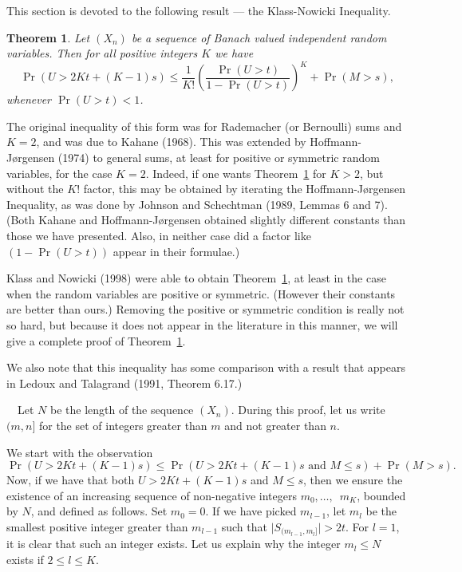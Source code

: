 \documentclass[12pt]{article}
\newtheorem{thm}{Theorem}[section]
\newcommand{\smodo}[1]{{\mathopen|#1\mathclose|}}
\newcommand{\Proof}{\medskip\noindent{\bf Proof:}\ \ }
\begin{document}
This section is devoted to the following result --- the Klass-Nowicki
Inequality.

\begin{thm}
\label{klass-nowicki}
Let $(X_n)$ be a sequence of Banach valued independent random
variables. Then for all positive integers $K$ we have 
$$ \Pr(U > 2K t + (K-1)s)
   \le {\frac{1 }{ K!}} \left(\frac{\Pr(U > t) }{ 1 -
   \Pr(U > t) }\right)^{K}+ \Pr(M > s) ,$$
whenever $\Pr(U>t) < 1$.
\end{thm}

The original inequality of this form was 
for Rademacher (or Bernoulli) sums and $K=2$, and was due to Kahane
(1968). This was extended by Hoffmann-J{\o}rgensen (1974)
to general sums, at
least for positive or symmetric random variables, for the case $K =
2$.  
Indeed, if one wants Theorem~\ref{klass-nowicki}
for $K>2$, but without 
the $K!$ factor, this may be obtained by iterating the
Hoffmann-J{\o}rgensen Inequality, as was done by Johnson and 
Schechtman (1989, Lemmas 6 and 7).
(Both Kahane and Hoffmann-J{\o}rgensen obtained slightly different
constants 
than those we have presented.  Also, in neither case 
did a factor like $(1-\Pr(U>t))$ 
appear in their formulae.) 

Klass and Nowicki (1998) were able to obtain Theorem~\ref{klass-nowicki}, 
at least in the case when the random variables are positive or
symmetric. (However their constants are better than ours.) Removing
the 
positive or symmetric condition is really not so hard, but because 
it does not appear in the literature in this manner, we will give a 
complete proof of Theorem~\ref{klass-nowicki}.  

We also note that this inequality has some comparison with a result
that 
appears in Ledoux and Talagrand (1991, Theorem 6.17.)

\Proof  Let $N$ be the length of the sequence $(X_n)$. During this
proof, let us write $(m,n]$ for the set of integers greater than $m$
and not greater than $n$.

We start with the observation 
$$
  \Pr(U >  2K t+(K-1)s) 
  \le 
  \Pr(U >2K t+(K-1)s \text{ and } M \le s) + \Pr(M > s) .
$$
Now, if we have that both $U > 2K t+(K-1)s$ and $M \le s$, then we ensure
the existence of an increasing sequence of non-negative integers
$m_0,\dots,$\ 
$m_{K}$, bounded by $N$, and defined as follows. Set $m_0 = 0$. 
If we have picked $m_{l-1}$, let $m_l$ be the smallest positive
integer greater than $m_{l-1}$ such that $\smodo{S_{(m_{l-1},m_l]}} >
2t$.  For $l = 1$, it is clear that such an integer exists.
Let us explain why the  integer $m_l \le N$ exists if $2 \le l \le K$.
\end{document}
